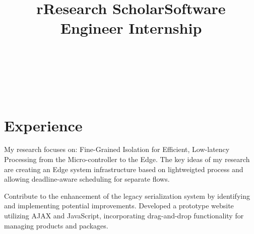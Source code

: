 \begin{format}
\title{r}\\
\\
\body\\
\end{format}
\section{Experience}
\title{Research Scholar}
\begin{position}
	\phantom{XXx}My research focuses on: Fine-Grained Isolation for Efficient, Low-latency Processing from the Micro-controller to the Edge. The key ideas of my research are creating an Edge system infrastructure based on lightweigted process and allowing deadline-aware scheduling for separate flows.
\end{position}

\title{Software Engineer Internship}
\begin{position}
	\phantom{XXx}Contribute to the enhancement of the legacy serialization system by identifying and implementing potential improvements. Developed a prototype website utilizing AJAX and JavaScript, incorporating drag-and-drop functionality for managing products and packages.
\end{position}

